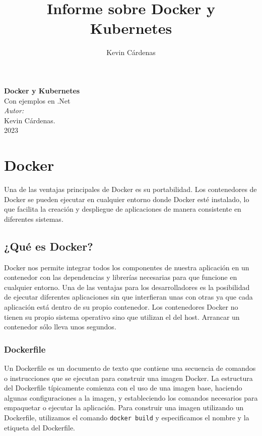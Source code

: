 \documentclass{article}
\title{Informe sobre Docker y Kubernetes}
\author{Kevin Cárdenas}
\begin{document}
\begin{titlepage}
    \begin{center}
        {\Huge \textbf{Docker y Kubernetes}\\
        Con ejemplos en .Net}
        \\[18cm]

        \large\emph{Autor:}\\
        Kevin Cárdenas.
        \\[1cm]
        {\large 2023}
    \end{center}
\end{titlepage}

\newpage
\tableofcontents
\newpage
\section{Docker}
Una de las ventajas principales de Docker es su portabilidad. Los contenedores de Docker se pueden ejecutar en cualquier entorno donde Docker esté instalado, lo que facilita la creación y despliegue de aplicaciones de manera consistente en diferentes sistemas.

\subsection*{¿Qué es Docker?}
Docker nos permite integrar todos los componentes de nuestra aplicación en un contenedor con las dependencias y librerías necesarias para que funcione en cualquier entorno. Una de las ventajas para los desarrolladores es la posibilidad de ejecutar diferentes aplicaciones sin que interfieran unas con otras ya que cada aplicación está dentro de su propio contenedor. Los contenedores Docker no tienen su propio sistema operativo sino que utilizan el del host. Arrancar un contenedor sólo lleva unos segundos.

\subsubsection*{Dockerfile}
Un Dockerfile es un documento de texto que contiene una secuencia de comandos o instrucciones que se ejecutan para construir una imagen Docker. La estructura del Dockerfile típicamente comienza con el uso de una imagen base, haciendo algunas configuraciones a la imagen, y estableciendo los comandos necesarios para empaquetar o ejecutar la aplicación. Para construir una imagen utilizando un Dockerfile, utilizamos el comando \lstinline{docker build} y especificamos el nombre y la etiqueta del Dockerfile.
\end{document}
